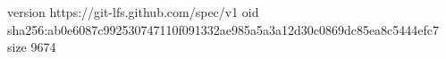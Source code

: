 version https://git-lfs.github.com/spec/v1
oid sha256:ab0e6087c992530747110f091332ae985a5a3a12d30c0869dc85ea8c5444efc7
size 9674
